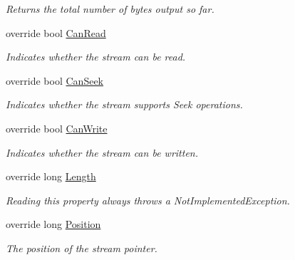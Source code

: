 \begin{DoxyCompactItemize}
\begin{DoxyCompactList}\small\item\em Returns the total number of bytes output so far.\end{DoxyCompactList}\item 
override bool \mbox{\hyperlink{class_super_tiled2_unity_1_1_ionic_1_1_zlib_1_1_deflate_stream_ac14fdce3c1478153b408701f5ccd6c80}{Can\+Read}}
\begin{DoxyCompactList}\small\item\em Indicates whether the stream can be read. \end{DoxyCompactList}\item 
override bool \mbox{\hyperlink{class_super_tiled2_unity_1_1_ionic_1_1_zlib_1_1_deflate_stream_a182a6e032256de45f32cc5699e2e3874}{Can\+Seek}}
\begin{DoxyCompactList}\small\item\em Indicates whether the stream supports Seek operations. \end{DoxyCompactList}\item 
override bool \mbox{\hyperlink{class_super_tiled2_unity_1_1_ionic_1_1_zlib_1_1_deflate_stream_ac5f47aa00496ecf0d7a434176c781478}{Can\+Write}}
\begin{DoxyCompactList}\small\item\em Indicates whether the stream can be written. \end{DoxyCompactList}\item 
override long \mbox{\hyperlink{class_super_tiled2_unity_1_1_ionic_1_1_zlib_1_1_deflate_stream_a552b6fd67670fa655ad82c4ca192bc7a}{Length}}
\begin{DoxyCompactList}\small\item\em Reading this property always throws a Not\+Implemented\+Exception. \end{DoxyCompactList}\item 
override long \mbox{\hyperlink{class_super_tiled2_unity_1_1_ionic_1_1_zlib_1_1_deflate_stream_a782ff32ec052231f846ecbf9e74bd0c8}{Position}}
\begin{DoxyCompactList}\small\item\em The position of the stream pointer. \end{DoxyCompactList}\end{DoxyCompactItemize}


